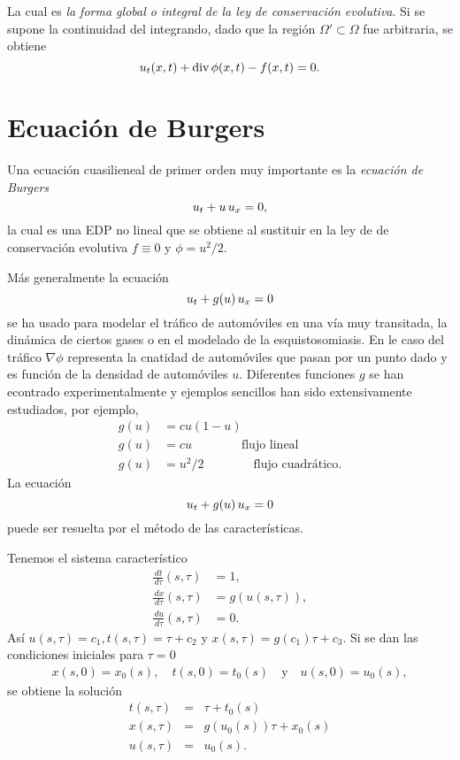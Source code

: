 La cual es \textit{la forma global o integral de la ley de conservación evolutiva}. Si se supone la continuidad del integrando, dado que la región $\Omega' \subset \Omega$ fue arbitraria, se obtiene 
\[
u_t (x,t) + \text{div} \thinspace \phi(x,t)-f(x,t) = 0.
\]  

\section{Ecuación de Burgers}
Una ecuación cuasilieneal de primer orden muy importante es la \textit{ecuación de Burgers}
\[ u_t + u \thinspace u_x = 0, \]
la cual es una EDP no lineal que se obtiene al sustituir en la ley de de conservación evolutiva $f \equiv 0$ y $\phi = u^2 /2$.

Más generalmente la ecuación 
\[
u_t + g(u) \thinspace u_x = 0
\]
se ha usado para modelar el tráfico de automóviles en una vía muy transitada, la dinámica de ciertos gases o en el modelado de la esquistosomiasis. En le caso del tráfico $\nabla \phi$ representa la cnatidad de automóviles que pasan por un punto dado y es función de la densidad de automóviles $u$. Diferentes funciones $g$ se han econtrado experimentalmente y ejemplos sencillos han sido extensivamente estudiados, por ejemplo,
\begin{align*}
g(u) &= cu (1-u) \\
g(u) &= cu \qquad \qquad \text{flujo lineal} \\
g(u) &= u^2/2 \qquad \qquad \text{flujo cuadrático}.
\end{align*}
La ecuación
\begin{equation*}
u_t + g(u) \thinspace u_x =0
\end{equation*}
puede ser resuelta por el método de las características.

Tenemos el sistema característico
\begin{align*}
\frac{\,dt}{\,d\tau} (s, \tau) &= 1,\\
\frac{\,dx}{\,d\tau} (s, \tau) &= g(u(s, \tau)),\\
\frac{\,du}{\,d\tau} (s, \tau) &= 0.
\end{align*}
Así $u(s,\tau)=c_1 , t(s,\tau) = \tau+c_2$ y $x (s,\tau)=g(c_1) \tau + c_3$. 
Si se dan las condiciones iniciales para $\tau=0$
\begin{align*}
x(s,0)=x_0(s), \quad t(s,0)=t_0(s) \quad \text{y} \quad u(s,0)=u_0(s),
\end{align*}
se obtiene la solución
\begin{eqnarray*}
t(s,\tau) &=& \tau + t_0(s) \\
x(s,\tau) &=& g(u_0(s)) \tau + x_0(s) \\
u(s,\tau) &=& u_0(s).
\end{eqnarray*}

